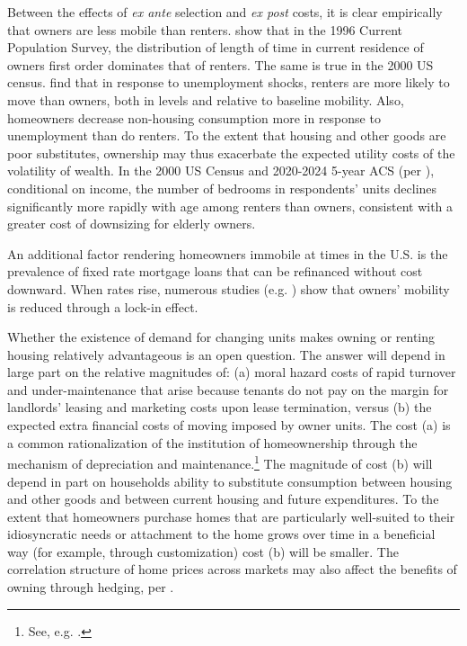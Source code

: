 \documentclass[12pt]{article}
\begin{document}
Between the effects of \emph{ex ante} selection and  \emph{ex post} costs, it is
clear empirically that owners are less mobile than renters.
\textcite{SchachterKuenzi} show that in the 1996 Current Population Survey, the
distribution of length of time in current residence of owners first order
dominates that of renters.  The same is true in the 2000 US census.
\textcite{ChettySzeidlra} find that in response to unemployment shocks, renters are
more likely to move than owners, both in levels and relative to baseline
mobility.  Also, homeowners decrease non-housing consumption more in response to
unemployment than do renters.  To the extent that housing and other goods are
poor substitutes, ownership may thus exacerbate the expected utility costs of
the volatility of wealth.  In the 2000 US Census and 2020-2024 5-year ACS (per
\textcite{IPUMS}), conditional on income, the number of bedrooms in
respondents' units declines significantly more rapidly with age among renters
than owners, consistent with a greater cost of downsizing for elderly owners.

An additional factor rendering homeowners immobile at times in the U.S. is the
prevalence of fixed rate mortgage loans that can be refinanced without cost
downward. When rates rise, numerous studies (e.g. \textcite{Rothstein}) show
that owners' mobility is reduced through a lock-in effect.

Whether the existence of demand for changing units makes owning or renting
housing relatively advantageous is an open question. The answer will depend in
large part on the relative magnitudes of: (a) moral hazard costs of rapid
turnover and under-maintenance that arise because tenants do not pay on the
margin for landlords' leasing and marketing costs upon lease termination,
versus (b) the expected extra financial costs of moving imposed by owner units.
The cost (a) is a common rationalization of the institution of homeownership
through the mechanism of depreciation and maintenance.\footnote{See, e.g.
\textcite{Shelton}.}  The magnitude of cost (b) will depend in part on
households ability to substitute consumption between housing and other goods
and between current housing and future expenditures. To the extent that
homeowners purchase homes that are particularly well-suited to their
idiosyncratic needs or attachment to the home grows over time in a beneficial
way (for example, through customization) cost (b) will be smaller. The
correlation structure of home prices across markets may also affect the
benefits of owning through hedging, per \textcite{SinaiSouleles}.
\end{document}
